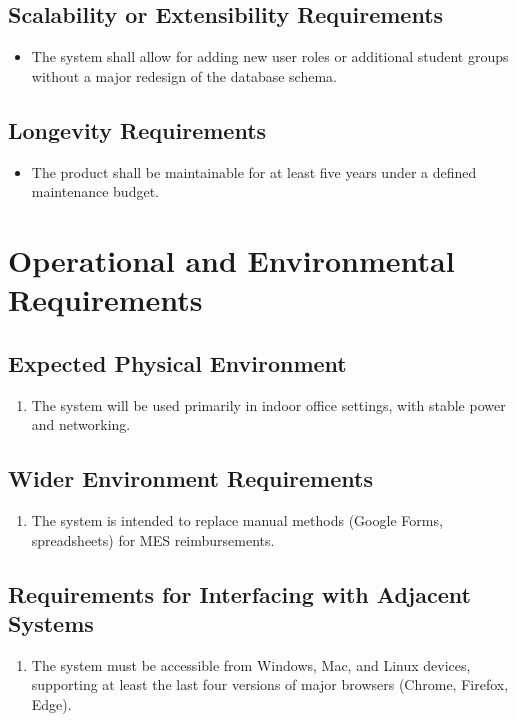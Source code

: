 \documentclass[12pt]{article}
\begin{document}
\subsection{Scalability or Extensibility Requirements}
\begin{itemize}
    \item The system shall allow for adding new user roles or additional student groups without a major redesign of the database schema.
\end{itemize}

\subsection{Longevity Requirements}
\begin{itemize}
    \item The product shall be maintainable for at least five years under a defined maintenance budget.
\end{itemize}

\section{Operational and Environmental Requirements}
\subsection{Expected Physical Environment}
\begin{enumerate}
  \item The system will be used primarily in indoor office settings, with stable power and networking. 
\end{enumerate}

\subsection{Wider Environment Requirements}
\begin{enumerate}
  \item The system is intended to replace manual methods (Google Forms, spreadsheets) for MES reimbursements.
\end{enumerate}

\subsection{Requirements for Interfacing with Adjacent Systems}
\begin{enumerate}
  \item The system must be accessible from Windows, Mac, and Linux devices, supporting at least the last four versions of major browsers (Chrome, Firefox, Edge).
\end{enumerate}
\end{document}
